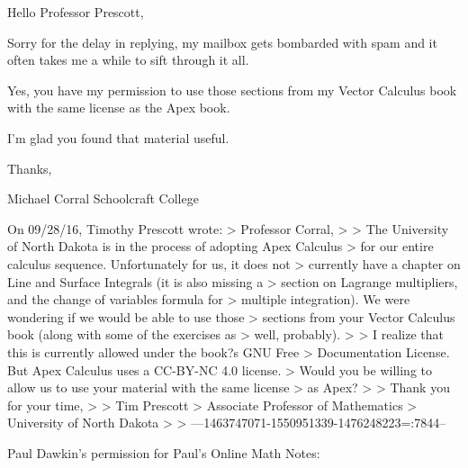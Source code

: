 \begin{itemize}
\begin{itemize}
Hello Professor Prescott,

Sorry for the delay in replying, my mailbox gets bombarded with
spam and it often takes me a while to sift through it all.

Yes, you have my permission to use those sections from my Vector
Calculus book with the same license as the Apex book.

I'm glad you found that material useful.

Thanks,

Michael Corral
Schoolcraft College

On 09/28/16, Timothy Prescott wrote:
> Professor Corral,
> 
> The University of North Dakota is in the process of adopting Apex Calculus
> for our entire calculus sequence.  Unfortunately for us, it does not
> currently have a chapter on Line and Surface Integrals (it is also missing a
> section on Lagrange multipliers, and the change of variables formula for
> multiple integration).  We were wondering if we would be able to use those
> sections from your Vector Calculus book (along with some of the exercises as
> well, probably).
> 
> I realize that this is currently allowed under the book?s GNU Free
> Documentation License.  But Apex Calculus uses a CC-BY-NC 4.0 license. 
> Would you be willing to allow us to use your material with the same license
> as Apex?
> 
> Thank you for your time,
> 
> Tim Prescott
> Associate Professor of Mathematics
> University of North Dakota
> 
>
---1463747071-1550951339-1476248223=:7844--


Paul Dawkin's permission for Paul's Online Math Notes:


\end{itemize}
\end{itemize}

